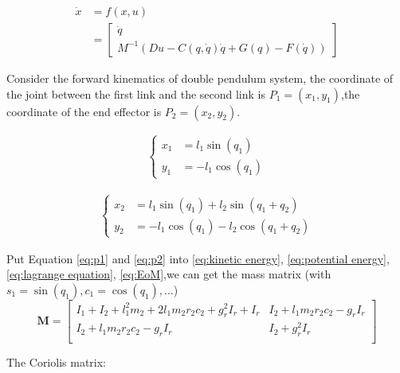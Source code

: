     \begin{equation}
    \begin{split}
        \dot{x} &= f(x,u) \\
        &= \begin{bmatrix} 
            \dot{q} \\ 
            M^{-1}(Du - C(q,\dot{q})\dot{q} + G(q) - F(\dot{q})) 
       \end{bmatrix}
    \end{split}
    \end{equation}

   Consider the forward kinematics of double pendulum system, the coordinate of the joint between the first link and the second link is \(P_1=(x_1,y_1)\),the coordinate of the end effector is \(P_2=(x_2,y_2)\).

    \begin{align}
        \label{eq:p1}
        \left\{
        \begin{aligned}
        x_1 &= l_1 \sin(q_1) \\
        y_1 &= - l_1 \cos(q_1)
        \end{aligned}
        \right.
    \end{align}

    \begin{align}
        \label{eq:p2}
        \left\{
        \begin{aligned}
        x_2 &= l_1 \sin(q_1) + l_2 \sin(q_1 + q_2) \\
        y_2 &= -l_1 \cos(q_1) - l_2 \cos(q_1 + q_2)
        \end{aligned}
        \right.
    \end{align}

    Put Equation \ref{eq:p1} and \ref{eq:p2} into \ref{eq:kinetic energy}, \ref{eq:potential energy}, \ref{eq:lagrange equation}, \ref{eq:EoM},we can get the mass matrix (with \(s_1 = \sin(q_1), c_1 = \cos(q_1), \ldots\))
    \begin{equation}
    \mathbf{M} =
    \left[ 
    {\begin{array}{cc}
    I_1 + I_2 + l_1^2m_2 + 2l_1m_2r_2c_2 + g_r^2I_r + I_r  &   I_2 + l_1m_2r_2c_2 - g_rI_r  \\
    I_2 + l_1m_2r_2c_2 - g_rI_r                    & I_2 + g_r^2I_r                       \\
    \end{array}} 
    \right]
    \end{equation}
    
    The Coriolis matrix:
    
